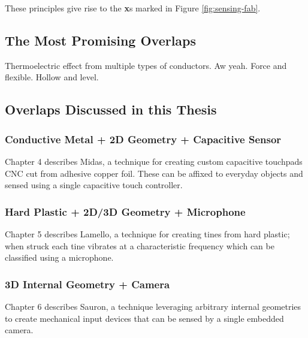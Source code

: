     These principles give rise to the \textbf{x}s marked in Figure \ref{fig:sensing-fab}.
    
\subsection{The Most Promising Overlaps}

    
    Thermoelectric effect from multiple types of conductors. Aw yeah. Force and flexible. Hollow and level.
    
\subsection{Overlaps Discussed in this Thesis}

    \subsubsection{Conductive Metal + 2D Geometry + Capacitive Sensor}
    
    Chapter 4 describes Midas, a technique for creating custom capacitive touchpads CNC cut from adhesive copper foil. These can be affixed to everyday objects and sensed using a single capacitive touch controller.
    
    \subsubsection{Hard Plastic + 2D/3D Geometry + Microphone}
    
    Chapter 5 describes Lamello, a technique for creating tines from hard plastic; when struck each tine vibrates at a characteristic frequency which can be classified using a microphone.
    
    \subsubsection{3D Internal Geometry + Camera}
    
    Chapter 6 describes Sauron, a technique leveraging arbitrary internal geometries to create mechanical input devices that can be sensed by a single embedded camera.